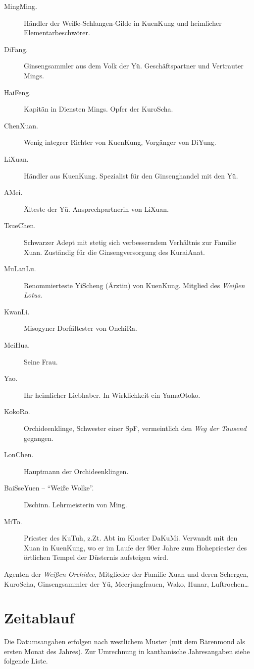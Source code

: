 \documentclass[
a4paper,
twoside,
DIV=calc,
BCOR=4mm,
fontsize=9pt,
twocolumn=on,
titlepage=on,
parskip=half
]{scrartcl}
\begin{document}
\begin{description}
\item[MingMing.] Händler der Weiße-Schlangen-Gilde in KuenKung und
  heimlicher Elementarbeschwörer.
\item[DiFang.] Ginsengsammler aus dem Volk der Yü. Geschäftspartner
  und Vertrauter Mings.
\item[HaiFeng.] Kapitän in Diensten Mings. Opfer der KuroScha.
\item[ChenXuan.] Wenig integrer Richter von KuenKung, Vorgänger von
  DiYung.
\item[LiXuan.] Händler aus KuenKung. Spezialist für den
  Ginsenghandel mit den Yü.
\item[AMei.] Älteste der Yü. Ansprechpartnerin von LiXuan.
\item[TsueChen.] Schwarzer Adept mit stetig sich verbesserndem
  Verhältnis zur Familie Xuan. Zuständig für die Ginsengversorgung
  des KuraiAnat.
\item[MuLanLu.] Renommierteste YiScheng (Ärztin) von
  KuenKung. Mitglied des \emph{Weißen Lotus}.
\item[KwanLi.] Misogyner Dorfältester von OnchiRa.
\item[MeiHua.] Seine Frau.
\item[Yao.] Ihr heimlicher Liebhaber. In Wirklichkeit ein YamaOtoko.
\item[KokoRo.] Orchideenklinge, Schwester einer SpF, vermeintlich
  den \emph{Weg der Tausend} gegangen.
\item[LonChen.] Hauptmann der Orchideenklingen.
\item[BaiSseYuen -- "`Weiße Wolke"'.] Dschinn. Lehrmeisterin von Ming.
\item[MiTo.] Priester des KuTuh, z.Zt. Abt im Kloster DaKuMi. Verwandt
  mit den Xuan in KuenKung, wo er im Laufe der 90er Jahre zum
  Hohepriester des örtlichen Tempel der Düsternis aufsteigen wird.
\end{description}

Agenten der \emph{Weißen Orchidee}, Mitglieder der Familie Xuan und
deren Schergen, KuroScha, Ginsengsammler der Yü, Meerjungfrauen, Wako,
Hunar, Luftrochen\dots

\section{Zeitablauf}

Die Datumsangaben erfolgen nach westlichem Muster (mit dem Bärenmond
als ersten Monat des Jahres). Zur Umrechnung in kanthanische
Jahresangaben siehe folgende Liste.
\end{document}
